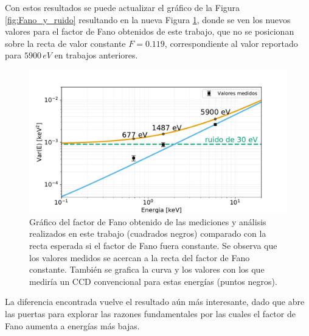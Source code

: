 Con estos resultados se puede actualizar el gráfico de la Figura \ref{fig:Fano_y_ruido} resultando en la nueva Figura \ref{fig:Fano_y_ruido_final}, donde se ven los nuevos valores para el factor de Fano obtenidos de este trabajo, que no se posicionan sobre la recta de valor constante $F = 0.119$, correspondiente al valor reportado para $5900\,\si{eV}$ en trabajos anteriores\cite{Rodrigues}.
\begin{figure}[H]
    \centering
        \includegraphics[scale=0.5]{Figs/FanoyRuidoFinal.pdf}
    \caption{Gráfico del factor de Fano obtenido de las mediciones y análisis realizados en este trabajo (cuadrados negros) comparado con la recta esperada si el factor de Fano fuera constante. Se observa que los valores medidos se acercan a la recta del factor de Fano constante. También se grafica la curva y los valores con los que mediría un CCD convencional para estas energías (puntos negros).}
    \label{fig:Fano_y_ruido_final}
\end{figure}

La diferencia encontrada vuelve el resultado aún más interesante, dado que abre las puertas para explorar las razones fundamentales por las cuales el factor de Fano aumenta a energías más bajas.